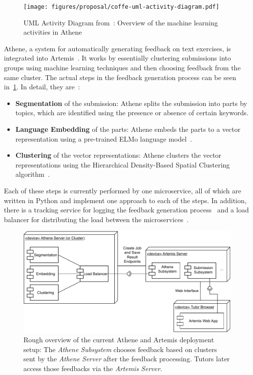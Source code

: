 \begin{figure}[ht]
    \centering
    \texttt{[image: figures/proposal/coffe-uml-activity-diagram.pdf]}
    \caption{UML Activity Diagram from~\cite{cofee}: Overview of the machine learning activities in Athene}
    \label{fig:coffeeUmlActivityDiagram}
\end{figure}

Athene, a system for automatically generating feedback on text exercises, is integrated into Artemis~\cite{cofee}. It works by essentially clustering submissions into groups using machine learning techniques and then choosing feedback from the same cluster. The actual steps in the feedback generation process can be seen in~\cref{fig:coffeeUmlActivityDiagram}. In detail, they are~\cite{cofee}:
\begin{itemize}
    \item \textbf{Segmentation} of the submission: Athene splits the submission into parts by topics, which are identified using the presence or absence of certain keywords.
    \item \textbf{Language Embedding} of the parts: Athene embeds the parts to a vector representation using a pre-trained ELMo language model~\cite{deepContextualizedWordRepresentations}.
    \item \textbf{Clustering} of the vector representations: Athene clusters the vector representations using the Hierarchical Density-Based Spatial Clustering algorithm~\cite{hdbsc}.
\end{itemize}

Each of these steps is currently performed by one microservice, all of which are written in Python and implement one approach to each of the steps.
In addition, there is a tracking service for logging the feedback generation process~\cite{atheneTracking} and a load balancer for distributing the load between the microservices~\cite{atheneLoadBalancer}.

\begin{figure}[ht]
    \centering
    \includegraphics[width=0.8\linewidth]{figures/proposal/deployment-diagram.pdf}
    \caption{Rough overview of the current Athene and Artemis deployment setup: The \textit{Athene Subsystem} chooses feedback based on clusters sent by the \textit{Athene Server} after the feedback processing. Tutors later access those feedbacks via the \textit{Artemis Server}.}
    \label{fig:atheneArtemisDeployment}
\end{figure}

